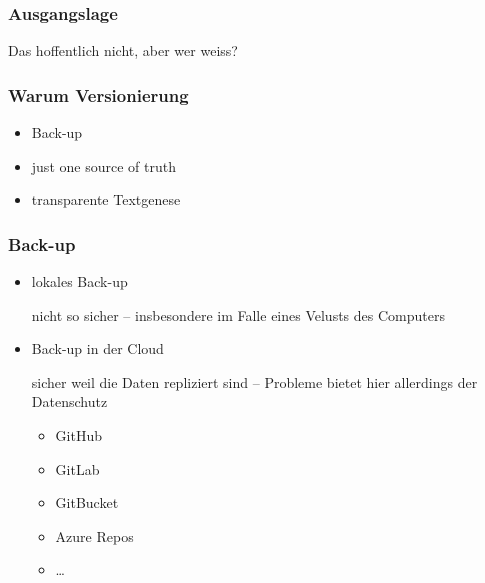 \documentclass[table]{beamer}
\begin{document}
    \begin{frame}
        \frametitle{Ausgangslage}
        Das hoffentlich nicht, aber wer weiss?

        \vspace*{5mm}

       
    \end{frame}

    \begin{frame}
        \frametitle{Warum Versionierung}

        \begin{itemize}
            \item Back-up
            \item just one source of truth
            \item transparente Textgenese
        \end{itemize}
    \end{frame}

    \begin{frame}
        \frametitle{Back-up}

        \begin{itemize}
            \item lokales Back-up
                
            nicht so sicher -- insbesondere im Falle eines Velusts des
            Computers
            
           \item Back-up in der Cloud
           
           sicher weil die Daten repliziert sind -- Probleme bietet hier
           allerdings der Datenschutz
           
           \begin{itemize}
            \item GitHub
            \item GitLab
            \item GitBucket
            \item Azure Repos
            \item \dots
           \end{itemize}
        \end{itemize}   
        
    
    \end{frame}
\end{document}
